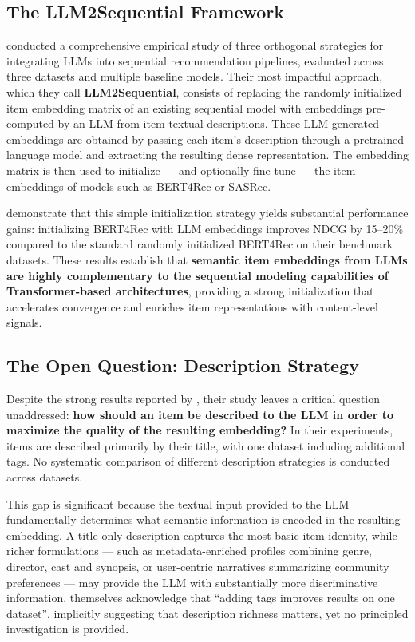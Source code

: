 \documentclass[12pt,a4paper]{report}
\newcommand{\textcite}[1]{\citet{#1}}
\begin{document}
\subsection{The LLM2Sequential Framework}

\textcite{boz2025improving} conducted a comprehensive empirical
study of three orthogonal strategies for integrating LLMs into
sequential recommendation pipelines, evaluated across three
datasets and multiple baseline models. Their most impactful
approach, which they call \textbf{LLM2Sequential}, consists of
replacing the randomly initialized item embedding matrix of an
existing sequential model with embeddings pre-computed by an LLM
from item textual descriptions. These LLM-generated embeddings
are obtained by passing each item's description through a
pretrained language model and extracting the resulting dense
representation. The embedding matrix is then used to initialize
--- and optionally fine-tune --- the item embeddings of models
such as BERT4Rec or SASRec.

\textcite{boz2025improving} demonstrate that this simple
initialization strategy yields substantial performance gains:
initializing BERT4Rec with LLM embeddings improves NDCG by
15--20\% compared to the standard randomly initialized BERT4Rec
on their benchmark datasets. These results establish that
\textbf{semantic item embeddings from LLMs are highly
complementary to the sequential modeling capabilities of
Transformer-based architectures}, providing a strong initialization
that accelerates convergence and enriches item representations
with content-level signals.

\subsection{The Open Question: Description Strategy}

Despite the strong results reported by \textcite{boz2025improving},
their study leaves a critical question unaddressed: \textbf{how
should an item be described to the LLM in order to maximize the
quality of the resulting embedding?} In their experiments, items
are described primarily by their title, with one dataset including
additional tags. No systematic comparison of different description
strategies is conducted across datasets.

This gap is significant because the textual input provided to the
LLM fundamentally determines what semantic information is encoded
in the resulting embedding. A title-only description captures
the most basic item identity, while richer formulations --- such
as metadata-enriched profiles combining genre, director, cast and
synopsis, or user-centric narratives summarizing community
preferences --- may provide the LLM with substantially more
discriminative information. \textcite{boz2025improving} themselves
acknowledge that ``adding tags improves results on one dataset'',
implicitly suggesting that description richness matters, yet no
principled investigation is provided.
\end{document}
